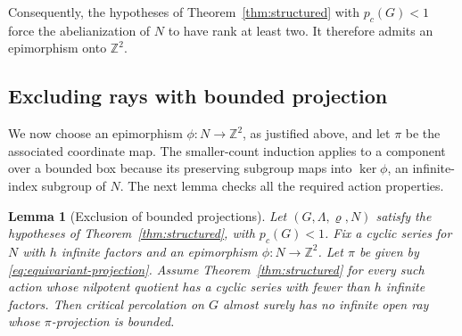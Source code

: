\documentclass[11pt]{article}
\newtheorem{lemma}[theorem]{Lemma}
\theoremstyle{definition}
\begin{document}
Consequently, the hypotheses of Theorem~\ref{thm:structured} with
$p_c(G)<1$ force the abelianization of $N$ to have rank at least two.
It therefore admits an epimorphism onto $\mathbb Z^2$.

\subsection{Excluding rays with bounded projection}

We now choose an epimorphism \(\phi:N\to\mathbb Z^2\), as justified
above, and let \(\pi\) be the associated coordinate map. The smaller-count
induction applies to a component over a bounded box because its
preserving subgroup maps into \(\ker\phi\), an infinite-index subgroup
of \(N\). The next lemma checks all the required action properties.

\begin{lemma}[Exclusion of bounded projections]
\label{lem:bounded-projection}
\label{lem:unbounded-projection}
Let $(G,\Lambda,\varrho,N)$ satisfy the hypotheses of
Theorem~\ref{thm:structured}, with $p_c(G)<1$. Fix a cyclic series for
$N$ with $h$ infinite factors and an epimorphism $\phi:N\to\mathbb Z^2$.
Let $\pi$ be given by \eqref{eq:equivariant-projection}. Assume
Theorem~\ref{thm:structured} for every such action whose nilpotent
quotient has a cyclic series with fewer than $h$ infinite factors.
Then critical percolation on $G$ almost surely has no infinite open ray
whose $\pi$-projection is bounded.
\end{lemma}
\end{document}
